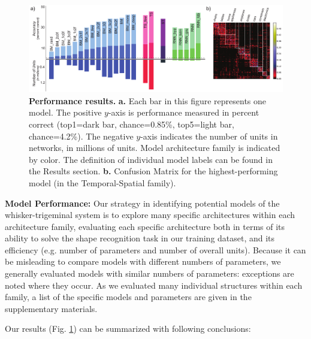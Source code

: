\begin{figure}
\includegraphics [width=1\linewidth]{figures/results.pdf}
\vspace{-3mm}
\caption{\footnotesize{\textbf{Performance results.} \textbf{a.} Each bar in this figure represents one model. The positive $y$-axis is performance measured in percent correct (top1=dark bar, chance=0.85\%, top5=light bar, chance=4.2\%).  The negative $y$-axis indicates the number of units in networks, in millions of units.  Model architecture family is indicated by color.  The definition of individual model labels can be found in the Results section. \textbf{b.} Confusion Matrix for the highest-performing model (in the Temporal-Spatial family).}~\label{fig_main}}
\vspace{-5mm}
\end{figure}

\textbf{Model Performance:} 
Our strategy in identifying potential models of the whisker-trigeminal system is to explore many specific architectures within each architecture family, evaluating each specific architecture both in terms of its ability to solve the shape recognition task in our training dataset, and its efficiency (e.g. number of parameters and number of overall units).
Because it can be misleading to compare models with different numbers of parameters, we generally evaluated models with similar numbers of parameters: exceptions are noted where they occur.
As we evaluated many individual structures within each family, a list of the specific models and parameters are given in the supplementary materials.

Our results (Fig. \ref{fig_main}) can be summarized with following conclusions:

